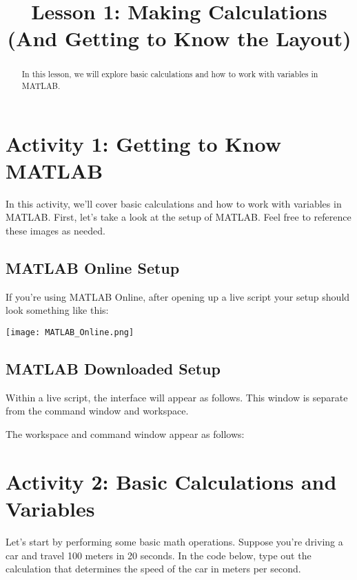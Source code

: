 \documentclass{ximera}
\title{Lesson 1: Making Calculations (And Getting to Know the Layout)}
\begin{document}
\begin{abstract}
In this lesson, we will explore basic calculations and how to work with variables in MATLAB.
\end{abstract}

\section*{Activity 1: Getting to Know MATLAB}

In this activity, we'll cover basic calculations and how to work with variables in MATLAB. 
First, let's take a look at the setup of MATLAB. Feel free to reference these images as needed.

\subsection*{MATLAB Online Setup}

If you're using MATLAB Online, after opening up a live script your setup should look something like this:

\begin{center}
    \texttt{[image: MATLAB\_Online.png]}
\end{center}

\subsection*{MATLAB Downloaded Setup}

Within a live script, the interface will appear as follows. This window is separate from the command window and workspace.


The workspace and command window appear as follows:


\section*{Activity 2: Basic Calculations and Variables}

Let's start by performing some basic math operations. Suppose you're driving a car and travel 100 meters in 20 seconds.
In the code below, type out the calculation that determines the speed of the car in meters per second.
\end{document}

